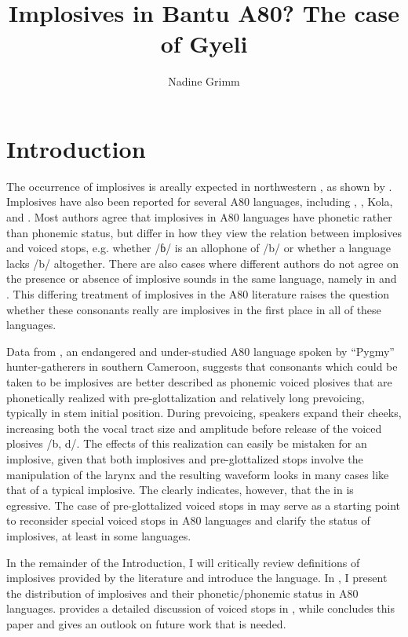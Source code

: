 \documentclass[output=paper]{LSP/langsci}
\author{Nadine Grimm\affiliation{University of Rochester}  
}
\title{Implosives in {B}antu {A}80? {T}he case of {G}yeli}
\begin{document}
\section{Introduction} 
\label{sec:grimm:1}

 The occurrence of implosives is areally expected in northwestern , as shown by \citet[58]{Clements2008}. Implosives have also been reported for several  A80 languages, including , , Kola, and . Most authors agree that implosives in A80 languages have phonetic rather than phonemic status, but differ in how they view the relation between implosives and voiced stops, e.g. whether /ɓ/ is an allophone of /b/ or whether a language lacks /b/ altogether. There are also cases where different authors do not agree on the presence or absence of implosive sounds in the same language, namely in  and . This differing treatment of implosives in the A80 literature raises the question whether these consonants really are implosives in the first place in all of these languages.

Data from , an endangered and under-studied  A80 language spoken by ``Pygmy'' hunter-gatherers in southern Cameroon, suggests that consonants which could be taken to be implosives are better described as phonemic voiced plosives that are phonetically realized with pre-glottalization and relatively long prevoicing, typically in stem initial position. During prevoicing, speakers expand their cheeks, increasing both the vocal tract size and amplitude before release of the voiced plosives /b, d/.   The effects of this realization can easily be mistaken for an implosive, given that both implosives and pre-glottalized stops involve the manipulation of the larynx and the resulting waveform looks in many cases like that of a typical implosive. The  clearly indicates, however, that the  in  is egressive. The case of pre-glottalized voiced stops in  may serve as a starting point to reconsider special voiced stops in A80 languages and clarify the status of implosives, at least in some languages.

In the remainder of the Introduction, I will critically review definitions of implosives provided by the literature and introduce the  language. In , I present the distribution of implosives and their phonetic/phonemic status in  A80 languages.  provides a detailed discussion of voiced stops in , while  concludes this paper and gives an outlook on future work that is needed.
\end{document}
